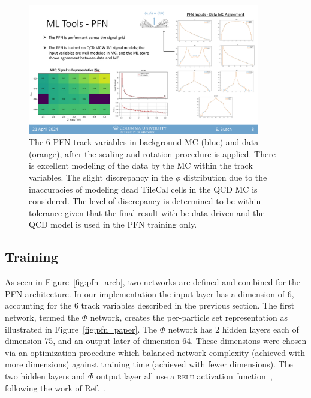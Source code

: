 \begin{figure}[!htbp]
   \centering
   \includegraphics[width=0.9\textwidth]{figures/ml/pfn_datamc_input}
    \caption{The 6 PFN track variables in background MC (blue) and data (orange), after the scaling and rotation procedure is applied. There is excellent modeling of the data by the MC within the track variables. The slight discrepancy in the $\phi$ distribution due to the inaccuracies of modeling dead TileCal cells in the QCD MC is considered. The level of discrepancy is determined to be within tolerance given that the final result with be data driven and the QCD model is used in the PFN training only.
    \label{fig:pfn_datamc_input}}
\end{figure}

\clearpage

\subsection{Training}
\label{sec:pfn_training}

As seen in Figure~\ref{fig:pfn_arch}, two networks are defined and combined for the PFN architecture. In our implementation the input layer has a dimension of 6, accounting for the 6 track variables described in the previous section. The first network, termed the $\Phi$ network, creates the per-particle set representation as illustrated in Figure~\ref{fig:pfn_paper}. The $\Phi$ network has 2 hidden layers each of dimension 75, and an output later of dimension 64. These dimensions were chosen via an optimization procedure which balanced network complexity (achieved with more dimensions) against training time (achieved with fewer dimensions). The two hidden layers and $\Phi$ output layer all use a \textsc{relu} activation function~\cite{scikit-learn}, following the work of Ref.~\cite{pfn}. 

